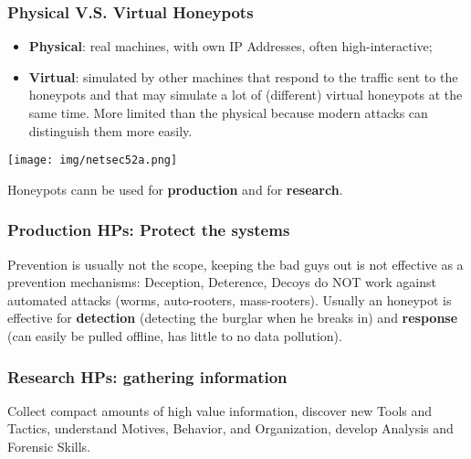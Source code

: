 \documentclass[a4paper, 10pt, titlepage]{article}
\begin{document}
\subsubsection*{Physical V.S. Virtual Honeypots}
\begin{itemize}
	\item \textbf{Physical}: real machines, with own IP Addresses, often high-interactive;
	\item \textbf{Virtual}: simulated by other machines that respond to the traffic sent to the honeypots and that may simulate a lot of (different) virtual honeypots at the same time. More limited than the physical because modern attacks can distinguish them more easily.
\end{itemize}
\begin{center}
	\texttt{[image: img/netsec52a.png]}
\end{center}
Honeypots cann be used for \textbf{production} and for \textbf{research}.

\subsubsection*{Production HPs: Protect the systems}
Prevention is usually not the scope, keeping the bad guys out is not effective as a prevention mechanisms: Deception, Deterence, Decoys do NOT work against automated attacks (worms, auto-rooters, mass-rooters). Usually an honeypot is effective for \textbf{detection} (detecting the burglar when he breaks in) and \textbf{response} (can easily be pulled offline, has little to no data pollution).

\subsubsection*{Research HPs: gathering information}
Collect compact amounts of high value information, discover new Tools and Tactics, understand Motives, Behavior, and Organization, develop Analysis and Forensic Skills.
\end{document}
